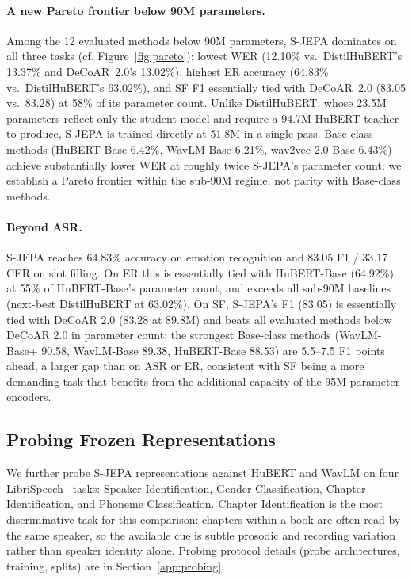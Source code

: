 \documentclass[9pt,twocolumn]{article}
\theoremstyle{plain}
\theoremstyle{definition}
\theoremstyle{remark}
\begin{document}
\paragraph{A new Pareto frontier below 90M parameters.} 
Among the 12 evaluated methods below 90M parameters, S-JEPA dominates on  all three tasks (cf. Figure~\ref{fig:pareto}): lowest WER (12.10\% vs.\ DistilHuBERT's 13.37\% and  DeCoAR~2.0's 13.02\%), highest ER accuracy (64.83\% vs.\ DistilHuBERT's  63.02\%), and SF F1 essentially tied with DeCoAR~2.0 (83.05 vs.\ 83.28) 
at 58\% of its parameter count. Unlike DistilHuBERT, whose 23.5M parameters reflect only the student model and require a 94.7M HuBERT teacher to produce, S-JEPA is trained directly at 51.8M in a single pass. Base-class methods (HuBERT-Base 6.42\%, WavLM-Base 6.21\%, wav2vec 2.0 Base 6.43\%) achieve substantially lower WER at roughly twice S-JEPA's parameter count; we establish a Pareto frontier within the sub-90M regime, not parity with Base-class methods.

\paragraph{Beyond ASR.} S-JEPA reaches 64.83\% accuracy on emotion recognition and 83.05 F1 / 33.17 CER on slot filling. On ER this is essentially tied with HuBERT-Base (64.92\%) at 55\% of HuBERT-Base's parameter count, and exceeds all sub-90M baselines (next-best DistilHuBERT at 63.02\%). On SF, S-JEPA's F1 (83.05) is essentially tied with DeCoAR 2.0 (83.28 at 89.8M) and beats all evaluated methods below DeCoAR 2.0 in parameter count; the strongest Base-class methods (WavLM-Base+ 90.58, WavLM-Base 89.38, HuBERT-Base 88.53) are 5.5--7.5 F1 points ahead, a larger gap than on ASR or ER, consistent with SF being a more demanding task that benefits from the additional capacity of the 95M-parameter encoders.


\subsection{Probing Frozen Representations}
\label{sec:probing}

We further probe S-JEPA representations against HuBERT and WavLM on four LibriSpeech~\citep{panayotov2015librispeech} tasks: Speaker Identification, Gender Classification, Chapter Identification, and Phoneme Classification. Chapter Identification is the most discriminative task for this comparison: chapters within a book are often read by the same speaker, so the available cue is subtle prosodic and recording variation rather than speaker identity alone. Probing protocol details (probe architectures, training, splits) are in Section~\ref{app:probing}.
\end{document}
